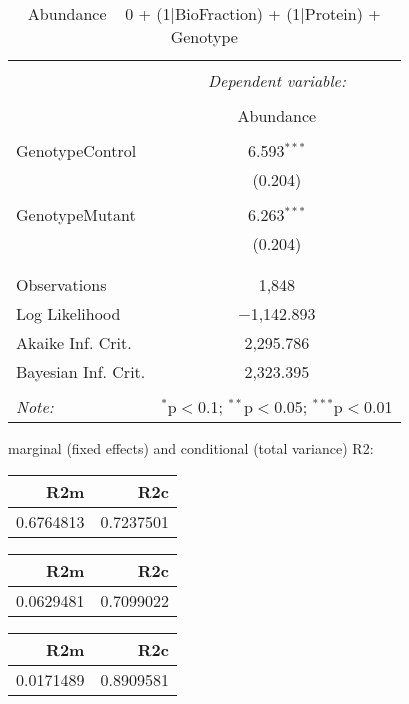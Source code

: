 \documentclass[11pt]{report}
\begin{document}
\begin{table}[!htbp] \centering 
  \caption{Abundance ~ 0 + (1|BioFraction) + (1|Protein) + Genotype} 
  \label{} 
\begin{tabular}{@{\extracolsep{5pt}}lc} 
\\[-1.8ex]\hline 
\hline \\[-1.8ex] 
 & \multicolumn{1}{c}{\textit{Dependent variable:}} \\ 
\cline{2-2} 
\\[-1.8ex] & Abundance \\ 
\hline \\[-1.8ex] 
 GenotypeControl & 6.593$^{***}$ \\ 
  & (0.204) \\ 
  & \\ 
 GenotypeMutant & 6.263$^{***}$ \\ 
  & (0.204) \\ 
  & \\ 
\hline \\[-1.8ex] 
Observations & 1,848 \\ 
Log Likelihood & $-$1,142.893 \\ 
Akaike Inf. Crit. & 2,295.786 \\ 
Bayesian Inf. Crit. & 2,323.395 \\ 
\hline 
\hline \\[-1.8ex] 
\textit{Note:}  & \multicolumn{1}{r}{$^{*}$p$<$0.1; $^{**}$p$<$0.05; $^{***}$p$<$0.01} \\ 
\end{tabular} 
\end{table} 
marginal (fixed effects) and conditional (total variance) R2:

\begin{tabular}{r|r}
\hline
R2m & R2c\\
\hline
0.6764813 & 0.7237501\\
\hline
\end{tabular}

\begin{tabular}{r|r}
\hline
R2m & R2c\\
\hline
0.0629481 & 0.7099022\\
\hline
\end{tabular}

\begin{tabular}{r|r}
\hline
R2m & R2c\\
\hline
0.0171489 & 0.8909581\\
\hline
\end{tabular}
\end{document}
